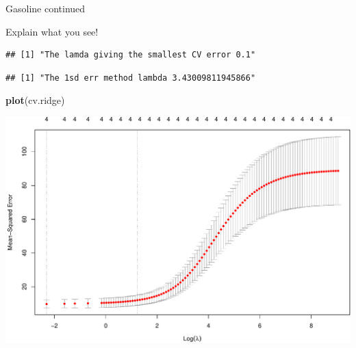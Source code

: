 \documentclass[
  ignorenonframetext,
]{beamer}
\newenvironment{Shaded}{\begin{snugshade}}{\end{snugshade}}
\newcommand{\DataTypeTok}[1]{\textcolor[rgb]{0.13,0.29,0.53}{#1}}
\newcommand{\DecValTok}[1]{\textcolor[rgb]{0.00,0.00,0.81}{#1}}
\newcommand{\FloatTok}[1]{\textcolor[rgb]{0.00,0.00,0.81}{#1}}
\newcommand{\KeywordTok}[1]{\textcolor[rgb]{0.13,0.29,0.53}{\textbf{#1}}}
\newcommand{\NormalTok}[1]{#1}
\newcommand{\OperatorTok}[1]{\textcolor[rgb]{0.81,0.36,0.00}{\textbf{#1}}}
\newcommand{\StringTok}[1]{\textcolor[rgb]{0.31,0.60,0.02}{#1}}
\begin{document}
\begin{frame}[fragile]

\begin{block}{Gasoline continued}

Explain what you see!

\begin{Shaded}
\end{Shaded}

\begin{verbatim}
## [1] "The lamda giving the smallest CV error 0.1"
\end{verbatim}

\begin{Shaded}
\end{Shaded}

\begin{verbatim}
## [1] "The 1sd err method lambda 3.43009811945866"
\end{verbatim}

\begin{Shaded}
\begin{Highlighting}[]
\KeywordTok{plot}\NormalTok{(cv.ridge)}
\end{Highlighting}
\end{Shaded}

\includegraphics{L2_files/figure-beamer/unnamed-chunk-10-1.pdf}


\end{block}
\end{frame}
\end{document}
